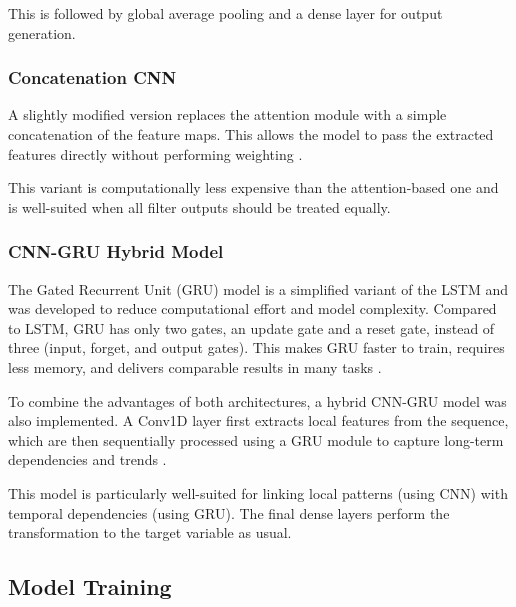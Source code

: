 This is followed by global average pooling and a dense layer for output generation.



\subsubsection{Concatenation CNN}

A slightly modified version replaces the attention module with a simple concatenation of the feature maps.
This allows the model to pass the extracted features directly without performing weighting \cite{keras-concat}.

This variant is computationally less expensive than the attention-based one and is well-suited when all filter outputs should be treated equally.



\subsubsection{CNN-GRU Hybrid Model}

The Gated Recurrent Unit (GRU) model is a simplified variant of the LSTM and was developed to reduce computational effort and model complexity.
Compared to LSTM, GRU has only two gates, an update gate and a reset gate, instead of three (input, forget, and output gates).
This makes GRU faster to train, requires less memory, and delivers comparable results in many tasks \cite{gru-basics}.

To combine the advantages of both architectures, a hybrid CNN-GRU model was also implemented.
A Conv1D layer first extracts local features from the sequence, which are then sequentially processed using a GRU module to capture long-term dependencies and trends \cite{cnn-gru}.

This model is particularly well-suited for linking local patterns (using CNN) with temporal dependencies (using GRU).
The final dense layers perform the transformation to the target variable as usual.



\subsection{Model Training}

